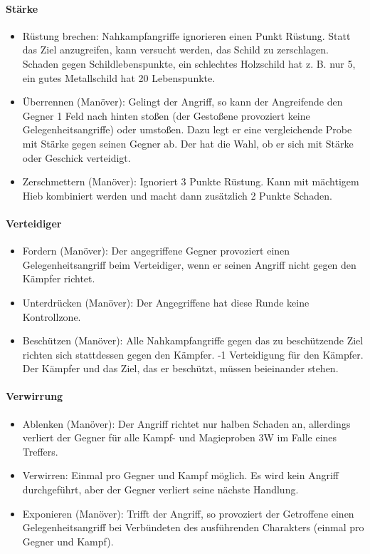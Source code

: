 \documentclass{article}
\begin{document}
\paragraph{Stärke}

\begin{itemize}
\item Rüstung brechen: Nahkampfangriffe ignorieren einen Punkt Rüstung. Statt das Ziel anzugreifen, kann versucht werden, das Schild zu zerschlagen. Schaden gegen Schildlebenspunkte, ein schlechtes Holzschild hat z. B. nur 5, ein gutes Metallschild hat 20 Lebenspunkte.
\item Überrennen (Manöver): Gelingt der Angriff, so kann der Angreifende den Gegner 1 Feld nach hinten stoßen (der Gestoßene provoziert keine Gelegenheitsangriffe) oder umstoßen. Dazu legt er eine vergleichende Probe mit Stärke gegen seinen Gegner ab. Der hat die Wahl, ob er sich mit Stärke oder Geschick verteidigt.
\item Zerschmettern (Manöver): Ignoriert 3 Punkte Rüstung. Kann mit mächtigem Hieb kombiniert werden und macht dann zusätzlich 2 Punkte Schaden.
\end{itemize}

\paragraph{Verteidiger}

\begin{itemize}
\item Fordern (Manöver): Der angegriffene Gegner provoziert einen Gelegenheitsangriff beim Verteidiger, wenn er seinen Angriff nicht gegen den Kämpfer richtet.
\item Unterdrücken (Manöver): Der Angegriffene hat diese Runde keine Kontrollzone.
\item Beschützen (Manöver): Alle Nahkampfangriffe gegen das zu beschützende Ziel richten sich stattdessen gegen den Kämpfer. -1 Verteidigung für den Kämpfer. Der Kämpfer und das Ziel, das er beschützt, müssen beieinander stehen.
\end{itemize}

\paragraph{Verwirrung}

\begin{itemize}
\item Ablenken (Manöver): Der Angriff richtet nur halben Schaden an, allerdings verliert der Gegner für alle Kampf- und Magieproben 3W im Falle eines Treffers.
\item Verwirren: Einmal pro Gegner und Kampf möglich. Es wird kein Angriff durchgeführt, aber der Gegner verliert seine nächste Handlung.
\item Exponieren (Manöver): Trifft der Angriff, so provoziert der Getroffene einen Gelegenheitsangriff bei Verbündeten des ausführenden Charakters (einmal pro Gegner und Kampf).
\end{itemize}
\end{document}
